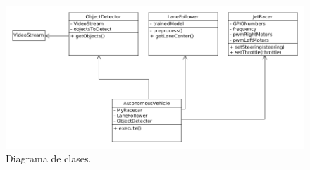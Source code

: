 \begin{figure} [h!]
	\begin{center}
		\includegraphics[width=14cm]{figs/diagram5}
	\end{center}
	\caption{Diagrama de clases.}
	\label{fig:diagram}
\end{figure}\

